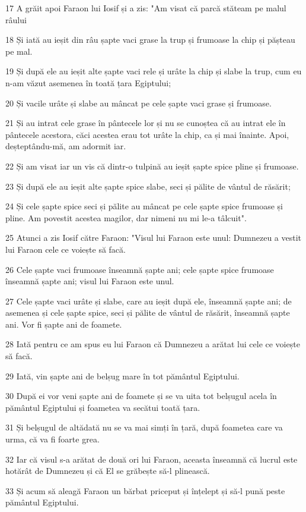 \par 17 A grăit apoi Faraon lui Iosif și a zis: "Am visat că parcă stăteam pe malul râului
\par 18 Și iată au ieșit din râu șapte vaci grase la trup și frumoase la chip și pășteau pe mal.
\par 19 Și după ele au ieșit alte șapte vaci rele și urâte la chip și slabe la trup, cum eu n-am văzut asemenea în toată țara Egiptului;
\par 20 Și vacile urâte și slabe au mâncat pe cele șapte vaci grase și frumoase.
\par 21 Și au intrat cele grase în pântecele lor și nu se cunoștea că au intrat ele în pântecele acestora, căci acestea erau tot urâte la chip, ca și mai înainte. Apoi, deșteptându-mă, am adormit iar.
\par 22 Și am visat iar un vis că dintr-o tulpină au ieșit șapte spice pline și frumoase.
\par 23 Și după ele au ieșit alte șapte spice slabe, seci și pălite de vântul de răsărit;
\par 24 Și cele șapte spice seci și pălite au mâncat pe cele șapte spice frumoase și pline. Am povestit acestea magilor, dar nimeni nu mi le-a tâlcuit".
\par 25 Atunci a zis Iosif către Faraon: "Visul lui Faraon este unul: Dumnezeu a vestit lui Faraon cele ce voiește să facă.
\par 26 Cele șapte vaci frumoase înseamnă șapte ani; cele șapte spice frumoase înseamnă șapte ani; visul lui Faraon este unul.
\par 27 Cele șapte vaci urâte și slabe, care au ieșit după ele, înseamnă șapte ani; de asemenea și cele șapte spice, seci și pălite de vântul de răsărit, înseamnă șapte ani. Vor fi șapte ani de foamete.
\par 28 Iată pentru ce am spus eu lui Faraon că Dumnezeu a arătat lui cele ce voiește să facă.
\par 29 Iată, vin șapte ani de belșug mare în tot pământul Egiptului.
\par 30 După ei vor veni șapte ani de foamete și se va uita tot belșugul acela în pământul Egiptului și foametea va secătui toată țara.
\par 31 Și belșugul de altădată nu se va mai simți în țară, după foametea care va urma, că va fi foarte grea.
\par 32 Iar că visul s-a arătat de două ori lui Faraon, aceasta înseamnă că lucrul este hotărât de Dumnezeu și că El se grăbește să-l plinească.
\par 33 Și acum să aleagă Faraon un bărbat priceput și înțelept și să-l pună peste pământul Egiptului.
